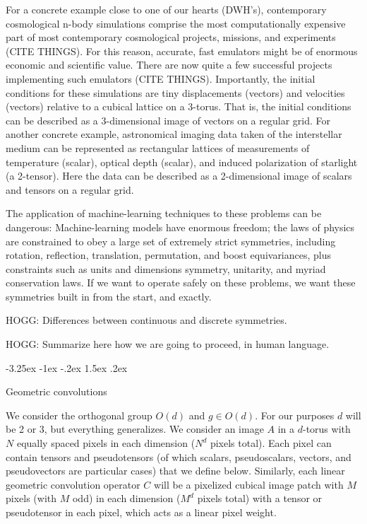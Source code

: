 \documentclass{article}
\makeatletter
\theoremstyle{plain}
\renewcommand\section{\@startsection {section}{1}{\z@}%
  {-3.25ex \@plus -1ex \@minus -.2ex}%
  {1.5ex \@plus .2ex}%
  {\raggedright\normalfont\large\bfseries}}
\makeatother
\begin{document}
For a concrete example close to one of our hearts (DWH's), contemporary cosmological n-body simulations comprise the most computationally expensive part of most contemporary cosmological projects, missions, and experiments (CITE THINGS).
For this reason, accurate, fast emulators might be of enormous economic and scientific value.
There are now quite a few successful projects implementing such emulators (CITE THINGS).
Importantly, the initial conditions for these simulations are tiny displacements (vectors) and velocities (vectors) relative to a cubical lattice on a 3-torus.
That is, the initial conditions can be described as a 3-dimensional image of vectors on a regular grid.
For another concrete example, astronomical imaging data taken of the interstellar medium can be represented as rectangular lattices of measurements of temperature (scalar), optical depth (scalar), and induced polarization of starlight (a 2-tensor).
Here the data can be described as a 2-dimensional image of scalars and tensors on a regular grid.

The application of machine-learning techniques to these problems can be dangerous:
Machine-learning models have enormous freedom; the laws of physics are constrained to obey a large set of extremely strict symmetries, including rotation, reflection, translation, permutation, and boost equivariances, plus constraints such as units and dimensions symmetry, unitarity, and myriad conservation laws.
If we want to operate safely on these problems, we want these symmetries built in from the start, and exactly.

HOGG: Differences between continuous and discrete symmetries.

HOGG: Summarize here how we are going to proceed, in human language.


\section{Geometric convolutions}\label{sec:convolution}

We consider the orthogonal group $O(d)$ and $g\in O(d)$. For our purposes $d$ will be 2 or 3, but everything generalizes.  
We consider an image $A$ in a $d$-torus with $N$ equally spaced pixels in each dimension ($N^d$ pixels total). Each pixel can contain tensors and pseudotensors (of which scalars, pseudoscalars, vectors, and pseudovectors are particular cases) that we define below.
Similarly, each linear geometric convolution operator $C$ will be a pixelized cubical image patch with $M$ pixels (with $M$ odd) in each dimension ($M^d$ pixels total) with a tensor or pseudotensor in each pixel, which acts as a linear pixel weight.
\end{document}
